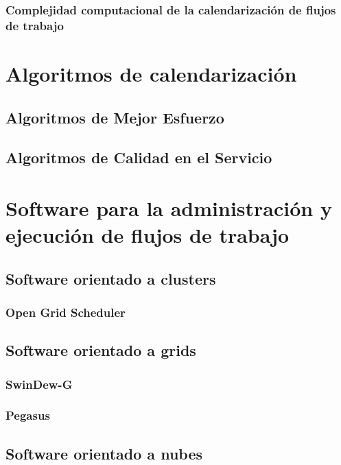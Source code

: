\documentclass[letterpaper, 12pt]{report}
\begin{document}
\subsection{Complejidad computacional de la calendarización de flujos de trabajo}


\chapter{Algoritmos de calendarización}

\section{Algoritmos de Mejor Esfuerzo}

\section{Algoritmos de Calidad en el Servicio}

\chapter{Software para la administración y ejecución de flujos de trabajo}

\section{Software orientado a clusters}

\subsection{Open Grid Scheduler}

\section{Software orientado a grids}

\subsection{SwinDew-G}

\subsection{Pegasus}

\section{Software orientado a nubes}
\end{document}
